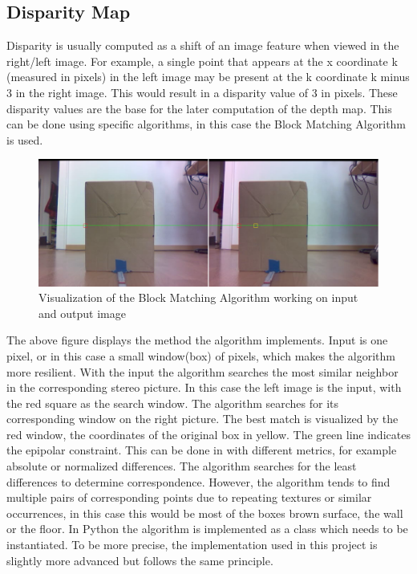 \documentclass[journal,onecolumn]{IEEEtran}
\begin{document}
\subsection{Disparity Map}
\noindent
Disparity is usually computed as a shift of an image feature when viewed in the right/left image. For example, a single point that appears at the x coordinate k (measured in pixels) in the left image may be present at the k coordinate k minus 3 in the right image. This would result in a disparity value of 3 in pixels. These disparity values are the base for the later computation of the depth map.
This can be done using specific algorithms, in this case the Block Matching Algorithm is used.
\begin{figure}[H]
	\centering
	\includegraphics[scale=0.65]{bma.png}
	\captionsetup{justification=centering}
	\caption{Visualization of the Block Matching Algorithm working on input and output image}
\end{figure}
\noindent
The above figure displays the method the algorithm implements. Input is one pixel, or in this case a small window(box) of pixels, which makes the algorithm more resilient. With the input the algorithm searches the most similar neighbor in the corresponding stereo picture. In this case the left image is the input, with the red square as the search window. The algorithm searches for its corresponding window on the right picture. The best match is visualized by the red window, the coordinates of the original box in yellow. The green line indicates the epipolar constraint.
This can be done in with different metrics, for example absolute or normalized differences. The algorithm searches for the least differences to determine correspondence. However, the algorithm tends to find multiple pairs of corresponding points due to repeating textures or similar occurrences, in this case this would be most of the boxes brown surface, the wall or the floor.
In Python the algorithm is implemented as a class which needs to be instantiated. To be more precise, the implementation used in this project is slightly more advanced\cite{SGBM} but follows the same principle.
\end{document}
